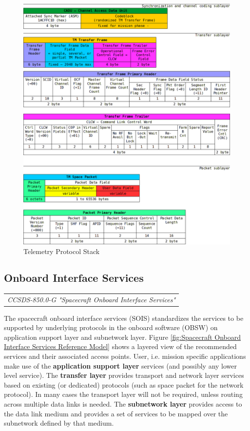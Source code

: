 \begin{figure}[h]
\centering\includegraphics[scale=0.4]{fig/telemetry_protocol_stack}
\caption{Telemetry Protocol Stack}
\label{fig:Telemetry Protocol Stack}
\end{figure}

\clearpage
\subsection{Onboard Interface Services}

\begin{tabular}{l}
\textit{CCSDS-850.0-G "Spacecraft Onboard Interface Services" \cite{CCSDS-850.0-G}} 
\end{tabular}

The spacecraft onboard interface services (SOIS) standardizes the services to be supported by underlying protocols in the onboard software (OBSW) on application support layer and subnetwork layer. Figure \ref{fig:Spacecraft Onboard Interface Services Reference Model} shows a layered view of the recommended services and their associated access points. User, i.e. mission specific applications make use of the \textbf{application support layer} services (and possibly any lower level service). The \textbf{transfer layer} provides transport and network layer services based on existing (or dedicated) protocols (such as space packet for the network protocol). In many cases the transport layer will not be required, unless routing across multiple data links is needed. The \textbf{subnetwork layer} provides access to the data link medium and provides a set of services to be mapped over the subnetwork defined by that medium.

